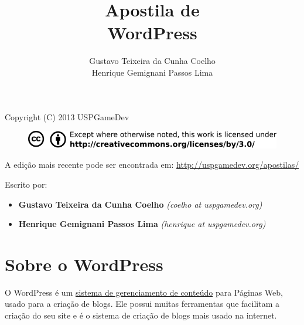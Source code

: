 \documentclass[12pt,onecolumn]{article}
\begin{document}
\begin{titlepage}

	\title{
		\bf
		\LARGE Apostila de  \\
		\Huge  WordPress
	}

	\author{Gustavo Teixeira da Cunha Coelho \\ Henrique Gemignani Passos Lima}

	\maketitle

	\thispagestyle{empty}

	\vfill
	

\end{titlepage}

	\thispagestyle{empty}

\begin{center}
  Copyright (C) 2013 USPGameDev
\end{center}
\begin{figure}[ht]
  \centering
  \includegraphics[width=\textwidth]{../CC-BY.png}
\end{figure}

\vfill

\begin{center}
A edição mais recente pode ser encontrada em:
\url{http://uspgamedev.org/apostilas/}
\end{center}

\vfill

Escrito por:
\begin{itemize}
  \item \textbf{Gustavo Teixeira da Cunha Coelho} \textit{(coelho at uspgamedev.org)}
  \item \textbf{Henrique Gemignani Passos Lima} \textit{(henrique at uspgamedev.org)}
\end{itemize}

\clearpage

\tableofcontents

\clearpage

\section{Sobre o WordPress}
	O WordPress é um \href{http://pt.wikipedia.org/wiki/Sistema_de_gerenciamento_de_conte%C3%BAdo}{
	sistema de gerenciamento de conteúdo} para Páginas Web, usado para a criação de blogs. Ele possui muitas 
	ferramentas que facilitam a criação do seu site e é o sistema de criação de blogs mais usado na internet.
\end{document}
